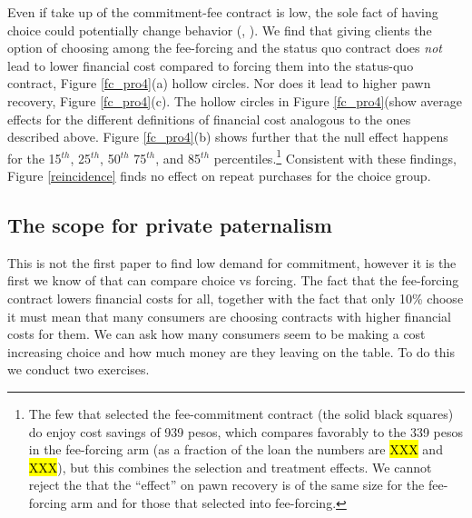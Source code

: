 \documentclass[11pt]{article}
\begin{document}
Even if take up of the commitment-fee contract is low, the sole fact of having choice could potentially change behavior (\cite{Dalboetal:2010}, \cite{Sjostrometal:2018}). We find that giving clients the option of choosing among the fee-forcing and the status quo contract does \textit{not} lead to lower financial cost compared to forcing them into the status-quo contract, Figure \ref{fc_pro4}(a) hollow circles. Nor does it lead to higher pawn recovery, Figure \ref{fc_pro4}(c). The hollow circles in Figure \ref{fc_pro4}(show average effects for the different definitions of financial cost analogous to the ones described above. Figure \ref{fc_pro4}(b) shows further that the null effect happens for the 15$^{th}$, 25$^{th}$, 50$^{th}$ 75$^{th}$, and 85$^{th}$ percentiles.\footnote{The few that selected the fee-commitment contract (the solid black squares) do enjoy cost savings of 939 pesos, which compares favorably to the 339 pesos in the fee-forcing arm (as a fraction of the loan the numbers are \hl{XXX} and \hl{XXX}), but this combines the selection and treatment effects. We cannot reject the that the ``effect'' on pawn recovery is of the same size for the fee-forcing arm and for those that selected into fee-forcing.} %
Consistent with these findings, Figure \ref{reincidence} finds no effect on repeat purchases for the choice group. 



\subsection{The scope for private paternalism}
    
This is not the first paper to find low demand for commitment, however it is the first we know of that can compare choice vs forcing. The fact that the fee-forcing contract lowers financial costs for all, together with the fact that only 10\% choose it must mean that many consumers are choosing contracts with higher financial costs for them. We can ask how many consumers seem to be making a cost increasing choice and how much money are they leaving on the table. To do this we conduct two exercises. 
\end{document}
